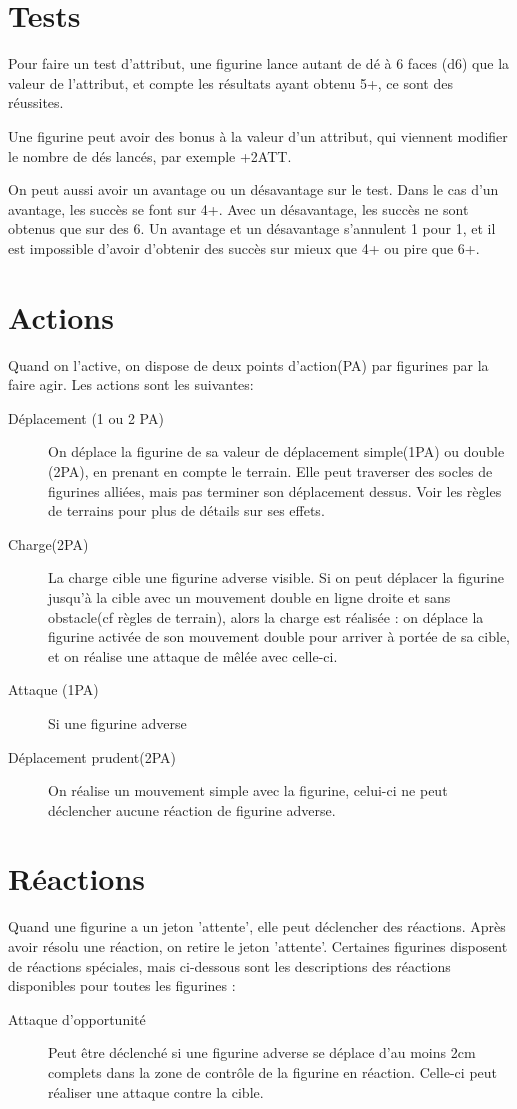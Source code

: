 \documentclass[10pt,a4paper]{article}
\begin{document}
\begin{multicols}{3}
\section*{Tests}
Pour faire un test d'attribut, une figurine lance autant de dé à 6 faces (d6) que la valeur de l'attribut, et compte les résultats ayant obtenu 5+, ce sont des réussites.

Une figurine peut avoir des bonus à la valeur d'un attribut, qui viennent modifier le nombre de dés lancés, par exemple +2ATT. 

On peut aussi avoir un avantage ou un désavantage sur le test. Dans le cas d'un avantage, les succès se font sur 4+. Avec un désavantage, les succès ne sont obtenus que sur des 6. Un avantage et un désavantage s'annulent 1 pour 1, et il est impossible d'avoir d'obtenir des succès sur mieux que 4+ ou pire que 6+.
\section*{Actions}
Quand on l'active, on dispose de deux points d'action(PA) par figurines par la faire agir. Les actions sont les suivantes: 
\begin{description}
\item[Déplacement (1 ou 2 PA)] On déplace la figurine de sa valeur de déplacement simple(1PA) ou double (2PA), en prenant en compte le terrain. Elle peut traverser des socles de figurines alliées, mais pas terminer son déplacement dessus. Voir les règles de terrains pour plus de détails sur ses effets.
\item[Charge(2PA)]La charge cible une figurine adverse visible. Si on peut déplacer la figurine jusqu'à la cible avec un mouvement double en ligne droite et sans obstacle(cf règles de terrain), alors la charge est réalisée : on déplace la figurine activée de son mouvement double pour arriver à portée de sa cible, et on réalise une attaque de mêlée avec celle-ci.
\item[Attaque (1PA)] Si une figurine adverse
\item[Déplacement prudent(2PA)]On réalise un mouvement simple avec la figurine, celui-ci ne peut déclencher aucune réaction de figurine adverse.
\end{description}
\section*{Réactions}
Quand une figurine a un jeton 'attente', elle peut déclencher des réactions. Après avoir résolu une réaction, on retire le jeton 'attente'. Certaines figurines disposent de réactions spéciales, mais ci-dessous sont les descriptions des réactions disponibles pour toutes les figurines :
\begin{description}
\item[Attaque d'opportunité]Peut être déclenché si une figurine adverse se déplace d'au moins 2cm complets dans la zone de contrôle de la figurine en réaction. Celle-ci peut réaliser une attaque contre la cible.
\end{description}

\end{multicols}
\end{document}
